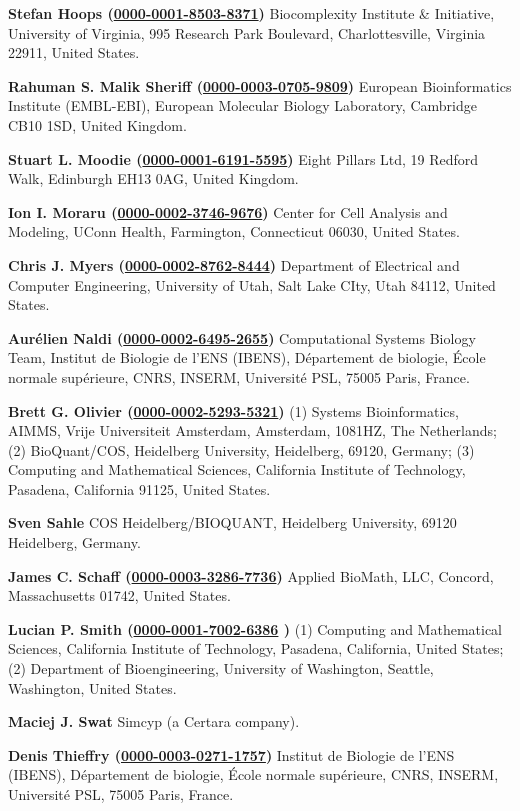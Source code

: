 \documentclass{sbml-paper}
\newcommand{\orcid}[1]{\href{https://orcid.org/#1}{#1}}
\begin{document}
\textbf{Stefan Hoops (\orcid{0000-0001-8503-8371})} Biocomplexity Institute \& Initiative, University of Virginia, 995 Research Park Boulevard, Charlottesville, Virginia 22911, United States.

\textbf{Rahuman S. Malik Sheriff (\orcid{0000-0003-0705-9809})} European Bioinformatics Institute (EMBL-EBI), European Molecular Biology Laboratory, Cambridge CB10 1SD, United Kingdom.

\textbf{Stuart L. Moodie (\orcid{0000-0001-6191-5595})} Eight Pillars Ltd, 19 Redford Walk, Edinburgh EH13 0AG, United Kingdom.

\textbf{Ion I. Moraru (\orcid{0000-0002-3746-9676})} Center for Cell Analysis and Modeling, UConn Health, Farmington, Connecticut 06030, United States.

\textbf{Chris J. Myers (\orcid{0000-0002-8762-8444})} Department of Electrical and Computer Engineering, University of Utah, Salt Lake CIty, Utah 84112, United States.

\textbf{Aurélien Naldi (\orcid{0000-0002-6495-2655})} Computational Systems Biology Team, Institut de Biologie de l’ENS (IBENS), Département de biologie, École normale supérieure, CNRS, INSERM, Université PSL, 75005 Paris, France.

\textbf{Brett G. Olivier (\orcid{0000-0002-5293-5321})} (1) Systems Bioinformatics, AIMMS, Vrije Universiteit Amsterdam, Amsterdam, 1081HZ, The Netherlands; (2) BioQuant/COS, Heidelberg University, Heidelberg, 69120, Germany; (3) Computing and Mathematical Sciences, California Institute of Technology, Pasadena, California 91125, United States.

\textbf{Sven Sahle} COS Heidelberg/BIOQUANT,  Heidelberg University, 69120 Heidelberg, Germany.

\textbf{James C. Schaff (\orcid{0000-0003-3286-7736})} Applied BioMath, LLC, Concord, Massachusetts 01742, United States.

\textbf{Lucian P. Smith (\orcid{0000-0001-7002-6386} )} (1) Computing and Mathematical Sciences, California Institute of Technology, Pasadena, California, United States; (2) Department of Bioengineering, University of Washington, Seattle, Washington, United States.

\textbf{Maciej J. Swat} Simcyp (a Certara company).

\textbf{Denis Thieffry (\orcid{0000-0003-0271-1757})} Institut de Biologie de l'ENS (IBENS), Département de biologie, École normale supérieure, CNRS, INSERM, Université PSL, 75005 Paris, France.
\end{document}
